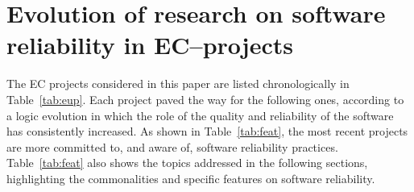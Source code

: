 \documentclass[journal]{IEEEtran}
\begin{document}
\section{Evolution of research on software reliability in EC--projects}
\label{sec:ev}

The EC projects considered in this paper are listed chronologically in Table~\ref{tab:eup}.
Each project paved the way for the following ones, according to a logic evolution in which
the role of the quality and reliability of the software has
consistently increased. As shown in Table~\ref{tab:feat}, the most recent projects are more
committed to, and aware of, software reliability practices.
Table~\ref{tab:feat} also shows the topics addressed in the following sections, highlighting
the commonalities and specific features on software reliability.
\end{document}
